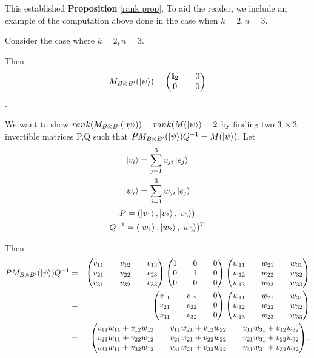 This established {\bf{Proposition}} \ref{rank prop}. To aid the reader, we include an example of the computation above done in the case when $k=2, n=3$.
\begin{example}
Consider the case where $k=2, n=3$.

Then 
$$M_{B \otimes B'}(\ket{\psi})=\begin{pmatrix}
\mathbb{I}_2 && 0 \\
0 && 0
\end{pmatrix}$$.

We want to show $rank(M_{B \otimes B'}(\ket{\psi}))=rank(M(\ket{\psi})=2$ by finding two $3\  \times 3$ invertible matrices P,Q such that $PM_{B \otimes B'}(\ket{\psi})Q^{-1}=M(\ket{\psi})$.
Let
\begin{gather*}
\ket{v_i}=\sum_{j=1}^3 v_{ji}\ket{e_j}\\
\ket{w_i}=\sum_{j=1}^3 w_{ji}\ket{e_j}\\
P=(\ket{v_1}, \ket{v_2}, \ket{v_3})\\
Q^{-1}=(\ket{w_1}, \ket{w_2}, \ket{w_3})^T
\end{gather*}

Then
\begin{eqnarray*}
P M_{B \otimes B'}(\ket{\psi}) Q^{-1}&=&\begin{pmatrix}
v_{11} && v_{12} && v_{13}\\
v_{21} && v_{22} && v_{23}\\
v_{31} && v_{32} && v_{33}
\end{pmatrix}
\begin{pmatrix}
1 && 0 && 0\\
0 && 1 && 0\\
0 && 0 && 0\\
\end{pmatrix}
\begin{pmatrix}
w_{11} && w_{21} && w_{31}\\
w_{12} && w_{22} && w_{32}\\
w_{13} && w_{23} && w_{33}
\end{pmatrix}\\
&=&\begin{pmatrix}
v_{11} && v_{12} && 0\\
v_{21} && v_{22} && 0\\
v_{31} && v_{32} && 0
\end{pmatrix}
\begin{pmatrix}
w_{11} && w_{21} && w_{31}\\
w_{12} && w_{22} && w_{32}\\
w_{13} && w_{23} && w_{33}
\end{pmatrix}\\
&=&\begin{pmatrix}
v_{11}w_{11}+v_{12}w_{12} && v_{11}w_{21}+v_{12}w_{22} && v_{11}w_{31}+v_{12}w_{32}\\
v_{21}w_{11}+v_{22}w_{12} && v_{21}w_{21}+v_{22}w_{22} && v_{21}w_{31}+v_{22}w_{32} \\
v_{31}w_{11}+v_{32}w_{12} && v_{31}w_{21}+v_{32}w_{22} && v_{31}w_{31}+v_{32}w_{32} \\
\end{pmatrix}.
\end{eqnarray*}



\end{example}

